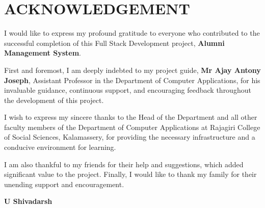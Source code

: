 \chapter*{ACKNOWLEDGEMENT}
\vspace{1cm}
I would like to express my profound gratitude to everyone who contributed to the successful completion of this Full Stack Development project, \textbf{Alumni Management System}.

First and foremost, I am deeply indebted to my project guide, \textbf{Mr Ajay Antony Joseph}, Assistant Professor in the Department of Computer Applications, for his invaluable guidance, continuous support, and encouraging feedback throughout the development of this project.

I wish to express my sincere thanks to the Head of the Department and all other faculty members of the Department of Computer Applications at Rajagiri College of Social Sciences, Kalamassery, for providing the necessary infrastructure and a conducive environment for learning.

I am also thankful to my friends for their help and suggestions, which added significant value to the project. Finally, I would like to thank my family for their unending support and encouragement.

\vspace{2cm}
\begin{flushright}
\textbf{U Shivadarsh}
\end{flushright}
